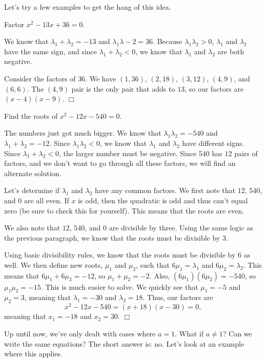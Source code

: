 \documentclass[lang=en,11pt]{elegantbook}
\begin{document}
Let's try a few examples to get the hang of this idea.
\begin{example}
Factor $x^2-13x+36=0$.
\end{example}
\begin{solution}
We know that $\lambda_1+\lambda_2=-13$ and $\lambda_1\lambda-2=36$.  Because $\lambda_1\lambda_2>0$, $\lambda_1$ and $\lambda_2$ have the same sign, and since $\lambda_1+\lambda_2<0$, we know that $\lambda_1$ and $\lambda_2$ are both negative.

Consider the factors of $36$.  We have $(1,36)$, $(2,18)$, $(3,12)$, $(4,9)$, and $(6,6)$.  The $(4,9)$ pair is the only pair that adds to $13$, so our factors are $(x-4)(x-9)$.  $\Box$ 
\end{solution}
\begin{example}
Find the roots of $x^2-12x-540=0$.
\end{example}
\begin{solution}
The numbers just got much bigger.  We know that $\lambda_1\lambda_2=-540$ and $\lambda_1+\lambda_2=-12$.  Since $\lambda_1\lambda_2<0$, we know that $\lambda_1$ and $\lambda_2$ have different signs.  Since $\lambda_1+\lambda_2<0$, the larger number must be negative.  Since $540$ has $12$ pairs of factors, and we don't want to go through all these factors, we will find an alternate solution.

Let's determine if $\lambda_1$ and $\lambda_2$ have any common factors.  We first note that $12$, $540$, and $0$ are all even.  If $x$ is odd, then the quadratic is odd and thus can't equal zero (be sure to check this for yourself).  This means that the roots are even.

We also note that $12$, $540$, and $0$ are divisible by three.  Using the same logic as the previous paragraph, we know that the roots must be divisible by $3$.

Using basic divisibility rules, we know that the roots must be divisible by $6$ as well.  We then define new roots, $\mu_1$ and $\mu_2$, such that $6\mu_1=\lambda_1$ and $6\mu_2=\lambda_2$.  This means that $6\mu_1+6\mu_2=-12$, so $\mu_1+\mu_2=-2$.  Also, $\left(6\mu_1\right)\left(6\mu_2\right)=-540$, so $\mu_1\mu_2=-15$.  This is much easier to solve.  We quickly see that $\mu_1=-5$ and $\mu_2=3$, meaning that $\lambda_1=-30 $ and $\lambda_2=18$.  Thus, our factors are $$x^2-12x-540=(x+18)(x-30)=0,$$ meaning that $x_1=-18$ and $x_2=30$.  $\Box$
\end{solution}
Up until now, we've only dealt with cases where $a=1$.  What if $a\neq 1$?  Can we write the same equations?  The short answer is: no.  Let's look at an example where this applies.
\end{document}
